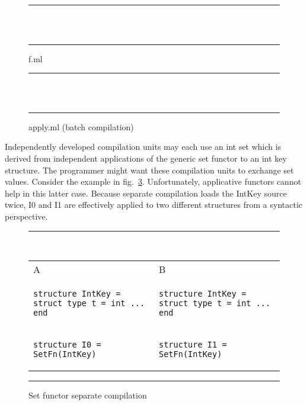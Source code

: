 \begin{figure}
\hrule
~
\begin{center}
\begin{tabular}{c}
  
\end{tabular}
\end{center}
\hrule
\caption{f.ml}
\label{fig:fml}
\end{figure}

\begin{figure}
  \hrule
~
\begin{center}
\begin{tabular}{c}
	
\end{tabular}
\end{center}
\hrule
	\caption{apply.ml (batch compilation)}
        \label{fig:apply2}
\end{figure}

\lstset{language=ML}

Independently developed compilation units may each use an int set which is derived from independent applications of the generic set functor to an int key structure. The programmer might want these compilation units to exchange set values. Consider the example in fig.~\ref{fig:intkeyexample}. Unfortunately, applicative functors cannot help in this latter case. Because separate compilation loads the IntKey source twice, I0 and I1 are effectively applied to two different structures from a syntactic perspective. 

\begin{figure}
\hrule
~
\begin{center}
\begin{tabular}{l|l}
A & B \\
\begin{lstlisting}
structure IntKey = struct type t = int ... end
\end{lstlisting}

&
\begin{lstlisting}
structure IntKey = struct type t = int ... end
\end{lstlisting}
\\
\begin{lstlisting}
structure I0 = SetFn(IntKey)
\end{lstlisting} & 

\begin{lstlisting}
structure I1 = SetFn(IntKey)	
\end{lstlisting}
\end{tabular}
\end{center}
\hrule
\caption{Set functor separate compilation}
\label{fig:intkeyexample}
\end{figure}

